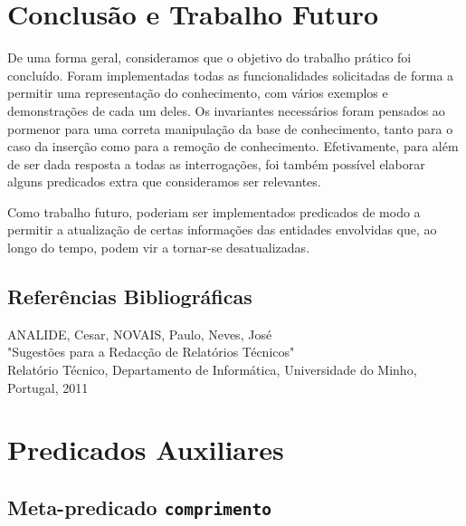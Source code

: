 \documentclass[a4paper, 11pt]{article}
\begin{document}
\pagebreak

\section{Conclusão e Trabalho Futuro}

De uma forma geral, consideramos que o objetivo do trabalho prático foi concluído. Foram implementadas todas as funcionalidades
solicitadas de forma a permitir uma representação do conhecimento, com vários exemplos e demonstrações de cada um deles.
Os invariantes necessários foram pensados ao pormenor para uma correta manipulação da base de conhecimento, tanto para o
caso da inserção como para a remoção de conhecimento. Efetivamente, para além de ser dada resposta a todas as interrogações,
foi também possível elaborar alguns predicados extra que consideramos ser relevantes.

Como trabalho futuro, poderiam ser implementados predicados de modo a permitir a atualização de certas informações das
entidades envolvidas que, ao longo do tempo, podem vir a tornar-se desatualizadas.

\pagebreak

\renewcommand\bibname{Referências}
\begin{thebibliography}{2}

\section*{Referências Bibliográficas}

ANALIDE, Cesar, NOVAIS, Paulo, Neves, José\\
"Sugestões para a Redacção de Relatórios Técnicos"\\
Relatório Técnico, Departamento de Informática, Universidade do Minho, Portugal, 2011

\end{thebibliography}

\pagebreak

\appendix

\pagebreak

\section{Predicados Auxiliares}

\subsection*{Meta-predicado \texttt{comprimento}}
\end{document}
